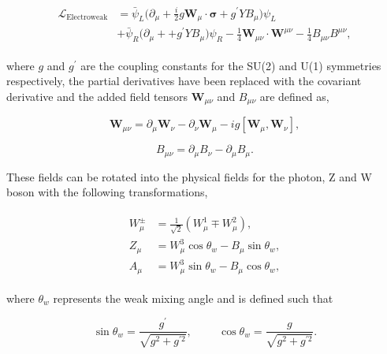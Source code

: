 \begin{align}
\begin{split}
\mathcal{L}_{\text{Electroweak}} &= \bar{\psi}_{L}\Big(\partial_{\mu} + \frac{i}{2} g \boldsymbol{W}_{\mu} \cdot \boldsymbol{\sigma} + g^{\prime} Y B_{\mu}  \Big) \psi_L \\
&+ \bar{\psi}_{R}\Big(\partial_{\mu} + + g^{\prime} Y B_{\mu}  \Big) \psi_R - \frac{1}{4} \boldsymbol{W}_{\mu\nu} \cdot \boldsymbol{W}^{\mu\nu} - \frac{1}{4}B_{\mu\nu}B^{\mu\nu},
\end{split}
\end{align}

where $g$ and $g^{\prime}$ are the coupling constants for the SU(2) and U(1) symmetries respectively, the partial derivatives have been replaced with the covariant derivative and the added field tensors $\boldsymbol{W}_{\mu\nu}$ and $B_{\mu\nu}$ are defined as,

\begin{equation}
\boldsymbol{W}_{\mu\nu} = \partial_{\mu} \boldsymbol{W}_{\nu} - \partial_{\nu} \boldsymbol{W}_{\mu} - ig[\boldsymbol{W}_{\mu},\boldsymbol{W}_{\nu}],
\end{equation}

\begin{equation}
B_{\mu\nu} = \partial_{\mu} B_{\nu} - \partial_{\mu} B_{\mu}.
\end{equation}

These fields can be rotated into the physical fields for the photon, Z and W boson with the following transformations,

\begin{align}
\begin{split}
W^{\pm}_{\mu} &= \frac{1}{\sqrt{2}}(W^{1}_{\mu} \mp W^{2}_{\mu}), \\
Z_{\mu} &= W^{3}_{\mu} \cos\theta_{w} - B_{\mu} \sin\theta_w, \\
A_{\mu} &= W^{3}_{\mu} \sin\theta_{w} - B_{\mu} \cos\theta_w,
\end{split}
\label{eqn:rotations}
\end{align}

where $\theta_w$ represents the weak mixing angle and is defined such that

\begin{equation}
\sin\theta_w = \frac{g^{\prime}}{\sqrt{g^2 + g^{\prime 2}}}, \hspace{1cm} \cos\theta_w = \frac{g}{\sqrt{g^2 + g^{\prime 2}}}.
\end{equation}

